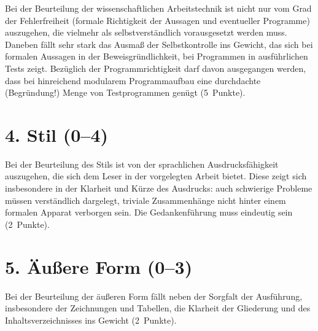 \documentclass[
    fontsize=12pt,
    headings=small,
    parskip=half,           %
    bibliography=totoc,
    numbers=noenddot,       %
    open=any,               %
    ]{scrreprt}
\begin{document}
Bei der Beurteilung der wissenschaftlichen Arbeitstechnik ist nicht nur vom Grad der Fehlerfreiheit (formale Richtigkeit der Aussagen und eventueller Programme) auszugehen, die vielmehr als selbstverständlich vorausgesetzt werden muss. Daneben fällt sehr stark das Ausmaß der Selbstkontrolle ins Gewicht, das sich bei formalen Aussagen in der Beweisgründlichkeit, bei Programmen in ausführlichen Tests zeigt. Bezüglich der Programmrichtigkeit darf davon ausgegangen werden, dass bei hinreichend modularem Programmaufbau eine durchdachte (Begründung!) Menge von Testprogrammen genügt (5~Punkte).

\section*{4. Stil (0--4)}

Bei der Beurteilung des Stils ist von der sprachlichen Ausdrucksfähigkeit auszugehen, die sich dem Leser in der vorgelegten Arbeit bietet. Diese zeigt sich insbesondere in der Klarheit und Kürze des Ausdrucks: auch schwierige Probleme müssen verständlich dargelegt, triviale Zusammenhänge nicht hinter einem formalen Apparat verborgen sein. Die Gedankenführung muss eindeutig sein (2~Punkte).

\section*{5. Äußere Form (0--3)}

Bei der Beurteilung der äußeren Form fällt neben der Sorgfalt der Ausführung, insbesondere der Zeichnungen und Tabellen, die Klarheit der Gliederung und des
Inhaltsverzeichnisses ins Gewicht (2~Punkte).


\end{document}
